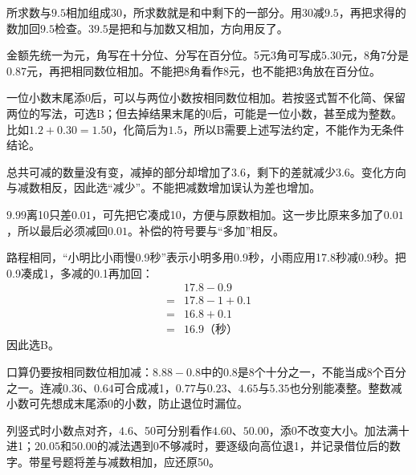 \documentclass[multi=snippet,border=0pt]{standalone}
\newenvironment{snippet}[3]{\begin{minipage}{#1bp}\color{answerred}\fontsize{#2}{#3}\selectfont\raggedright}{\end{minipage}}
\begin{document}
\begin{snippet}{505}{11.5}{14}所求数与\(9.5\)相加组成30，所求数就是和中剩下的一部分。用30减\(9.5\)，再把求得的数加回\(9.5\)检查。\(39.5\)是把和与加数又相加，方向用反了。\end{snippet}
\begin{snippet}{505}{11.5}{14}金额先统一为元，角写在十分位、分写在百分位。5元3角可写成\(5.30\)元，8角7分是\(0.87\)元，再把相同数位相加。不能把8角看作8元，也不能把3角放在百分位。\end{snippet}
\begin{snippet}{505}{11.5}{14}一位小数末尾添0后，可以与两位小数按相同数位相加。若按竖式暂不化简、保留两位的写法，可选B；但去掉结果末尾的0后，可能是一位小数，甚至成为整数。比如\(1.2+0.30=1.50\)，化简后为\(1.5\)，所以B需要上述写法约定，不能作为无条件结论。\end{snippet}
\begin{snippet}{505}{11.5}{14}总共可减的数量没有变，减掉的部分却增加了\(3.6\)，剩下的差就减少\(3.6\)。变化方向与减数相反，因此选“减少”。不能把减数增加误认为差也增加。\end{snippet}
\begin{snippet}{505}{11.5}{14}\(9.99\)离10只差\(0.01\)，可先把它凑成10，方便与原数相加。这一步比原来多加了\(0.01\)，所以最后必须减回\(0.01\)。补偿的符号要与“多加”相反。\end{snippet}
\begin{snippet}{505}{11.5}{14}路程相同，“小明比小雨慢0.9秒”表示小明多用0.9秒，小雨应用17.8秒减0.9秒。把0.9凑成1，多减的0.1再加回：\[\begin{aligned}&17.8-0.9\\={}&17.8-1+0.1\\={}&16.8+0.1\\={}&16.9\text{（秒）}\end{aligned}\]因此选B。\end{snippet}
\begin{snippet}{505}{11.5}{14}口算仍要按相同数位相加减：\(8.88-0.8\)中的\(0.8\)是8个十分之一，不能当成8个百分之一。连减\(0.36\)、\(0.64\)可合成减1，\(0.77\)与\(0.23\)、\(4.65\)与\(5.35\)也分别能凑整。整数减小数可先想成末尾添0的小数，防止退位时漏位。\end{snippet}
\begin{snippet}{505}{11.5}{14}列竖式时小数点对齐，\(4.6\)、50可分别看作\(4.60\)、\(50.00\)，添0不改变大小。加法满十进1；\(20.05\)和\(50.00\)的减法遇到0不够减时，要逐级向高位退1，并记录借位后的数字。带星号题将差与减数相加，应还原50。\end{snippet}
\end{document}
